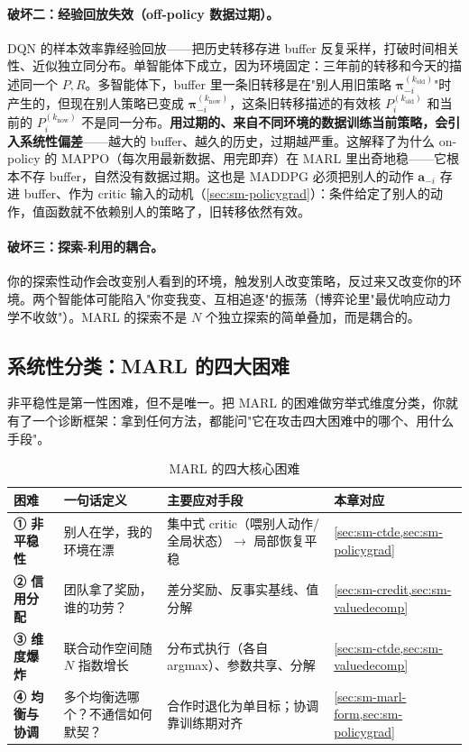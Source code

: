 \paragraph{破坏二：经验回放失效（off-policy 数据过期）。}
DQN 的样本效率靠经验回放——把历史转移存进 buffer 反复采样，打破时间相关性、近似独立同分布。单智能体下成立，因为环境固定：三年前的转移和今天的描述同一个 $P,R$。多智能体下，buffer 里一条旧转移是在"别人用旧策略 $\boldsymbol{\pi}_{-i}^{(k_{\text{old}})}$"时产生的，但现在别人策略已变成 $\boldsymbol{\pi}_{-i}^{(k_{\text{now}})}$，这条旧转移描述的有效核 $P_i^{(k_{\text{old}})}$ 和当前的 $P_i^{(k_{\text{now}})}$ 不是同一分布。\textbf{用过期的、来自不同环境的数据训练当前策略，会引入系统性偏差}——越大的 buffer、越久的历史，过期越严重。这解释了为什么 on-policy 的 MAPPO（每次用最新数据、用完即弃）在 MARL 里出奇地稳——它根本不存 buffer，自然没有数据过期。这也是 MADDPG 必须把别人的动作 $\mathbf{a}_{-i}$ 存进 buffer、作为 critic 输入的动机（\cref{sec:sm-policygrad}）：条件给定了别人的动作，值函数就不依赖别人的策略了，旧转移依然有效。

\paragraph{破坏三：探索-利用的耦合。}
你的探索性动作会改变别人看到的环境，触发别人改变策略，反过来又改变你的环境。两个智能体可能陷入"你变我变、互相追逐"的振荡（博弈论里"最优响应动力学不收敛"）。MARL 的探索不是 $N$ 个独立探索的简单叠加，而是耦合的。

\subsection{系统性分类：MARL 的四大困难}
\label{sec:sm-four-difficulties}

非平稳性是第一性困难，但不是唯一。把 MARL 的困难做穷举式维度分类，你就有了一个诊断框架：拿到任何方法，都能问"它在攻击四大困难中的哪个、用什么手段"。

\begin{table}[H]\centering\small
\caption{MARL 的四大核心困难}
\label{tab:sm-four-diff}
\begin{tabular}{p{} p{} p{} p{}}
\toprule
困难 & 一句话定义 & 主要应对手段 & 本章对应 \\
\midrule
\textbf{① 非平稳性} & 别人在学，我的环境在漂 & 集中式 critic（喂别人动作/全局状态）$\to$ 局部恢复平稳 & \cref{sec:sm-ctde,sec:sm-policygrad} \\
\textbf{② 信用分配} & 团队拿了奖励，谁的功劳？ & 差分奖励、反事实基线、值分解 & \cref{sec:sm-credit,sec:sm-valuedecomp} \\
\textbf{③ 维度爆炸} & 联合动作空间随 $N$ 指数增长 & 分布式执行（各自 argmax）、参数共享、分解 & \cref{sec:sm-ctde,sec:sm-valuedecomp} \\
\textbf{④ 均衡与协调} & 多个均衡选哪个？不通信如何默契？ & 合作时退化为单目标；协调靠训练期对齐 & \cref{sec:sm-marl-form,sec:sm-policygrad} \\
\bottomrule
\end{tabular}
\end{table}

